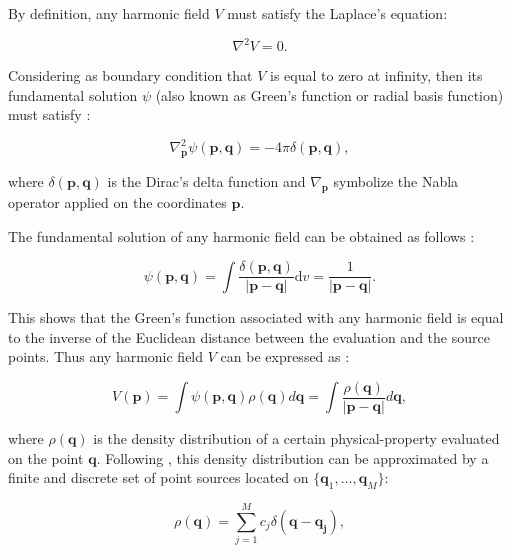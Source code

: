 \documentclass[twocolumn]{article}
\begin{document}
By definition, any harmonic field $V$ must satisfy the Laplace's equation:

\begin{equation}
    \nabla^2 V = 0.
\end{equation}

Considering as boundary condition that $V$ is equal to zero at infinity, then
its fundamental solution $\psi$ (also known as Green's function or radial basis
function) must satisfy \citep[p.~210]{vladimirov1979}:

\begin{equation}
    \nabla_\mathbf{p}^2 \psi(\mathbf{p}, \mathbf{q}) =
        - 4\pi \delta(\mathbf{p}, \mathbf{q}),
\end{equation}

\noindent where $\delta(\mathbf{p}, \mathbf{q})$ is the Dirac's delta function
and $\nabla_\mathbf{p}$ symbolize the Nabla operator applied on the coordinates
$\mathbf{p}$.

The fundamental solution of any harmonic field can be obtained as follows
\citep[p.~37]{blakely1995}:

\begin{equation}
    \psi(\mathbf{p}, \mathbf{q})
    =
    \int
    \frac{\delta(\mathbf{p}, \mathbf{q})}{|\mathbf{p} - \mathbf{q}|}
    \textrm{d}v
    =
    \frac{1}{|\mathbf{p} - \mathbf{q}|}.
\end{equation}

This shows that the Green's function associated with any harmonic field is
equal to the inverse of the Euclidean distance between the evaluation and the
source points.
Thus any harmonic field $V$ can be expressed as \citep[p.~37]{blakely1995}:

\begin{equation}
    V(\mathbf{p})
    =
    \int \psi(\mathbf{p}, \mathbf{q}) \rho(\mathbf{q}) d\mathbf{q}
    =
    \int \frac{\rho(\mathbf{q})}{|\mathbf{p} - \mathbf{q}|}  d\mathbf{q},
\end{equation}

\noindent where $\rho(\mathbf{q})$ is the density distribution of a certain
physical-property evaluated on the point $\mathbf{q}$. Following
\citet{dampney1969}, this density distribution can be approximated by a finite
and discrete set of point sources located on $\{\mathbf{q}_1, \ldots,
\mathbf{q}_M\}$:

\begin{equation}
    \rho(\mathbf{q}) =
        \sum\limits_{j=1}^{M} c_j \delta(\mathbf{q} - \mathbf{q_j}),
\end{equation}
\end{document}
